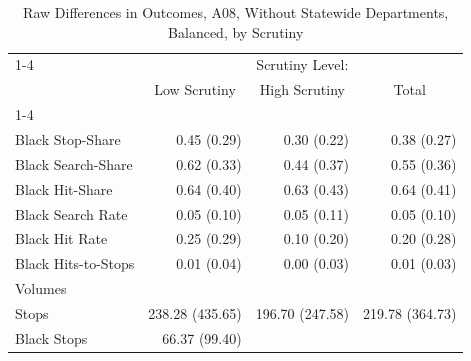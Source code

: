 \begin{table}[!h]
\caption{Raw Differences in Outcomes, A08, Without Statewide Departments, Balanced, by Scrutiny}
\centering
\begin{tabular}{llll}
\cline{1-4}
\multicolumn{1}{r}{} &
  \multicolumn{3}{c}{Scrutiny Level:} \\
\multicolumn{1}{r}{} &
  \multicolumn{1}{c}{Low Scrutiny} &
  \multicolumn{1}{c}{High Scrutiny} &
  \multicolumn{1}{c}{Total} \\
\cline{1-4}
\multicolumn{1}{l}{Rates} &
  \multicolumn{1}{r}{} &
  \multicolumn{1}{r}{} &
  \multicolumn{1}{r}{} \\
\multicolumn{1}{l}{\hspace{1em}Black Stop-Share} &
  \multicolumn{1}{r}{0.45 (0.29)} &
  \multicolumn{1}{r}{0.30 (0.22)} &
  \multicolumn{1}{r}{0.38 (0.27)} \\
\multicolumn{1}{l}{\hspace{1em}Black Search-Share} &
  \multicolumn{1}{r}{0.62 (0.33)} &
  \multicolumn{1}{r}{0.44 (0.37)} &
  \multicolumn{1}{r}{0.55 (0.36)} \\
\multicolumn{1}{l}{\hspace{1em}Black Hit-Share} &
  \multicolumn{1}{r}{0.64 (0.40)} &
  \multicolumn{1}{r}{0.63 (0.43)} &
  \multicolumn{1}{r}{0.64 (0.41)} \\
\multicolumn{1}{l}{\hspace{1em}Black Search Rate} &
  \multicolumn{1}{r}{0.05 (0.10)} &
  \multicolumn{1}{r}{0.05 (0.11)} &
  \multicolumn{1}{r}{0.05 (0.10)} \\
\multicolumn{1}{l}{\hspace{1em}Black Hit Rate} &
  \multicolumn{1}{r}{0.25 (0.29)} &
  \multicolumn{1}{r}{0.10 (0.20)} &
  \multicolumn{1}{r}{0.20 (0.28)} \\
\multicolumn{1}{l}{\hspace{1em}Black Hits-to-Stops} &
  \multicolumn{1}{r}{0.01 (0.04)} &
  \multicolumn{1}{r}{0.00 (0.03)} &
  \multicolumn{1}{r}{0.01 (0.03)} \\
\multicolumn{1}{l}{Volumes} &
  \multicolumn{1}{r}{} &
  \multicolumn{1}{r}{} &
  \multicolumn{1}{r}{} \\
\multicolumn{1}{l}{\hspace{1em}Stops} &
  \multicolumn{1}{r}{238.28 (435.65)} &
  \multicolumn{1}{r}{196.70 (247.58)} &
  \multicolumn{1}{r}{219.78 (364.73)} \\
\multicolumn{1}{l}{\hspace{1em}Black Stops} &
  \multicolumn{1}{r}{66.37 (99.40)} &

\end{tabular}
\end{table}
